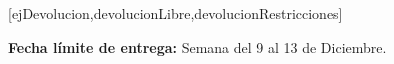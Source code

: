 \documentclass[11pt,heading,asymmetric,practice]{uniexer}
\begin{document}


[ejDevolucion,devolucionLibre,devolucionRestricciones]
 







\vspace*{2em}


\noindent \textbf{Fecha l\'imite de entrega:} Semana del 9 
al 13  de Diciembre. 
\end{document}
